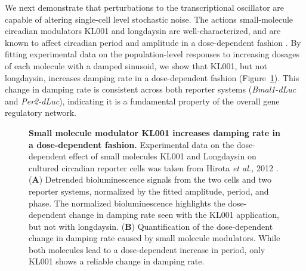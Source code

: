 \documentclass[11pt, letterpaper]{article}
\begin{document}

We next demonstrate that perturbations to the transcriptional oscillator are capable of altering single-cell level stochastic noise.
The actions small-molecule circadian modulators KL001 and longdaysin are well-characterized, and are known to affect circadian period and amplitude in a dose-dependent fashion \cite{St.John2014}.
By fitting experimental data on the population-level responses to increasing dosages of each molecule with a damped sinusoid, we show that KL001, but not longdaysin, increases damping rate in a dose-dependent fashion (Figure~\ref{fig:dose_dependence}).
This change in damping rate is consistent across both reporter systems ({\itshape Bmal1-dLuc} and {\itshape Per2-dLuc}), indicating it is a fundamental property of the overall gene regulatory network.

\begin{figure}[tbp]
  \begin{center}
  \end{center}
  \caption{{\bfseries Small molecule modulator KL001 increases damping rate in a dose-dependent fashion.}
  Experimental data on the dose-dependent effect of small molecules KL001 and Longdaysin on cultured circadian reporter cells was taken from Hirota {\itshape et al.,} 2012 \cite{Hirota2012}.
({\bfseries A}) Detrended bioluminescence signals from the two cells and two reporter systems, normalized by the fitted amplitude, period, and phase. The normalized bioluminescence highlights the dose-dependent change in damping rate seen with the KL001 application, but not with longdaysin.
({\bfseries B}) Quantification of the dose-dependent change in damping rate caused by small molecule modulators. While both molecules lead to a dose-dependent increase in period, only KL001 shows a reliable change in damping rate.}
\label{fig:dose_dependence}
\end{figure}
\end{document}
